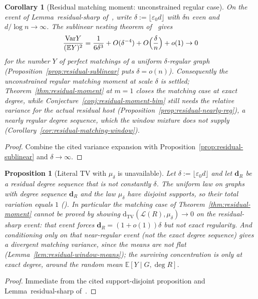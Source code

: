\documentclass[11pt]{article}
\newtheorem{corollary}[theorem]{Corollary}
\newtheorem{proposition}[theorem]{Proposition}
\newcommand{\EE}{\mathbb{E}}
\newcommand{\Var}{\mathrm{Var}}
\begin{document}
\begin{corollary}[Residual matching moment: unconstrained regular case]
\label{cor:residual-matching-proxy}
On the event of Lemma~residual-sharp of~\cite{PlusOneV1}, write
\(\delta:=\lfloor\varepsilon_0 d\rfloor\) with \(\delta n\) even and
\(d/\log n\to\infty\). The sublinear nesting theorem of~\cite{PlusOneV1}
gives
\[
\frac{\Var Y}{(\EE Y)^2}
=
\frac1{6\delta^3}+O(\delta^{-4})+O\Bigl(\frac{\delta}{n}\Bigr)+o(1)
\to0
\]
for the number \(Y\) of perfect matchings of a uniform \(\delta\)-regular
graph (Proposition~\ref{prop:residual-sublinear} puts \(\delta=o(n)\)).
Consequently the unconstrained regular matching moment at scale \(\delta\) is
settled; Theorem~\ref{thm:residual-moment} at \(m=1\) closes the matching case
\emph{at exact degree}, while Conjecture~\ref{conj:residual-moment-bim} still needs the
relative variance for the actual residual host (Proposition~\ref{prop:residual-nearly-reg}),
a nearly regular degree sequence, which the window mixture does not supply
(Corollary~\ref{cor:residual-matching-window}).
\end{corollary}

\begin{proof}
Combine the cited variance expansion with Proposition~\ref{prop:residual-sublinear}
and \(\delta\to\infty\).
\end{proof}

\begin{proposition}[Literal TV with \(\mu_\delta\) is unavailable]
\label{prop:residual-not-tv}
Let \(\delta:=\lfloor\varepsilon_0 d\rfloor\) and let \(\mathbf{d}_R\) be a residual
degree sequence that is not constantly \(\delta\). The uniform law on graphs
with degree sequence \(\mathbf{d}_R\) and the law \(\mu_\delta\) have disjoint
supports, so their total variation equals \(1\)
(\cite[Proposition~support-disjoint]{PlusOneV1}).
In particular the matching case of Theorem~\ref{thm:residual-moment} cannot be
proved by showing \(\mathrm{d_{TV}}(\mathcal{L}(R),\mu_\delta)\to0\) on the
residual-sharp event: that event forces \(\mathbf{d}_R=(1+o(1))\delta\) but not
exact regularity. And conditioning only on that near-regular event (not the exact
degree sequence) gives a \emph{divergent} matching variance, since the means are not
flat (Lemma~\ref{lem:residual-window-means}); the surviving concentration is only at
exact degree, around the random mean \(\EE[Y\mid G,\deg R]\).
\end{proposition}

\begin{proof}
Immediate from the cited support-disjoint proposition and
Lemma~residual-sharp of~\cite{PlusOneV1}.
\end{proof}
\end{document}

